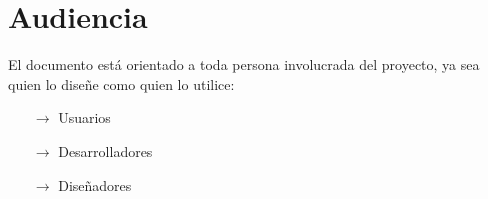 \newpage

\section{Audiencia}
\par El documento está orientado a toda persona involucrada del proyecto, ya sea quien lo diseñe como quien lo utilice:

\begin{itemize}
	\item[$\rightarrow$] Usuarios
	\item[$\rightarrow$] Desarrolladores
	\item[$\rightarrow$] Diseñadores
\end{itemize}
